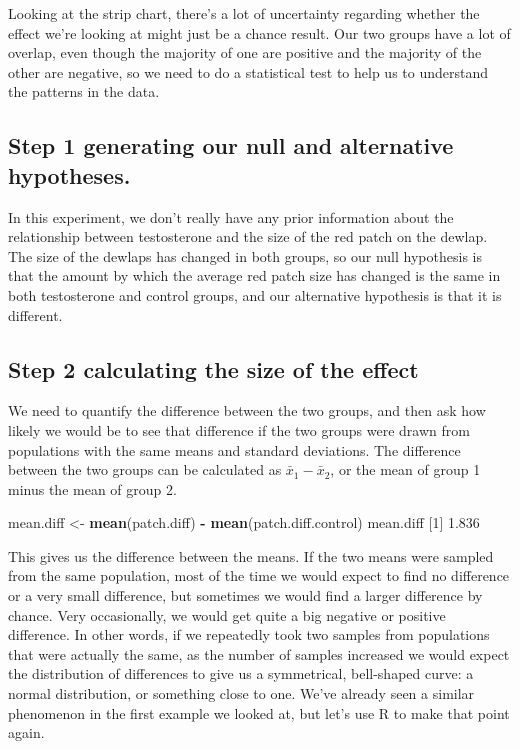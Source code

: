 \documentclass[
]{book}
\newenvironment{Shaded}{\begin{snugshade}}{\end{snugshade}}
\newcommand{\DecValTok}[1]{\textcolor[rgb]{0.00,0.00,0.81}{#1}}
\newcommand{\FloatTok}[1]{\textcolor[rgb]{0.00,0.00,0.81}{#1}}
\newcommand{\KeywordTok}[1]{\textcolor[rgb]{0.13,0.29,0.53}{\textbf{#1}}}
\newcommand{\NormalTok}[1]{#1}
\newcommand{\OperatorTok}[1]{\textcolor[rgb]{0.81,0.36,0.00}{\textbf{#1}}}
\newcommand{\StringTok}[1]{\textcolor[rgb]{0.31,0.60,0.02}{#1}}
\begin{document}
Looking at the strip chart, there's a lot of uncertainty regarding whether the effect we're looking at might just be a chance result. Our two groups have a lot of overlap, even though the majority of one are positive and the majority of the other are negative, so we need to do a statistical test to help us to understand the patterns in the data.

\hypertarget{step-1-generating-our-null-and-alternative-hypotheses.}{%
\subsection{Step 1 generating our null and alternative hypotheses.}\label{step-1-generating-our-null-and-alternative-hypotheses.}}

In this experiment, we don't really have any prior information about the relationship between testosterone and the size of the red patch on the dewlap. The size of the dewlaps has changed in both groups, so our null hypothesis is that the amount by which the average red patch size has changed is the same in both testosterone and control groups, and our alternative hypothesis is that it is different.

\hypertarget{step-2-calculating-the-size-of-the-effect}{%
\subsection{Step 2 calculating the size of the effect}\label{step-2-calculating-the-size-of-the-effect}}

We need to quantify the difference between the two groups, and then ask how likely we would be to see that difference if the two groups were drawn from populations with the same means and standard deviations. The difference between the two groups can be calculated as \(\bar{x}_{1} - \bar{x}_{2}\), or the mean of group 1 minus the mean of group 2.

\begin{Shaded}
\begin{Highlighting}[]
\NormalTok{mean.diff <-}\StringTok{ }\KeywordTok{mean}\NormalTok{(patch.diff) }\OperatorTok{-}\StringTok{ }\KeywordTok{mean}\NormalTok{(patch.diff.control)}
\NormalTok{mean.diff}
\NormalTok{[}\DecValTok{1}\NormalTok{] }\FloatTok{1.836}
\end{Highlighting}
\end{Shaded}

This gives us the difference between the means. If the two means were sampled from the same population, most of the time we would expect to find no difference or a very small difference, but sometimes we would find a larger difference by chance. Very occasionally, we would get quite a big negative or positive difference. In other words, if we repeatedly took two samples from populations that were actually the same, as the number of samples increased we would expect the distribution of differences to give us a symmetrical, bell-shaped curve: a normal distribution, or something close to one. We've already seen a similar phenomenon in the first example we looked at, but let's use R to make that point again.
\end{document}
